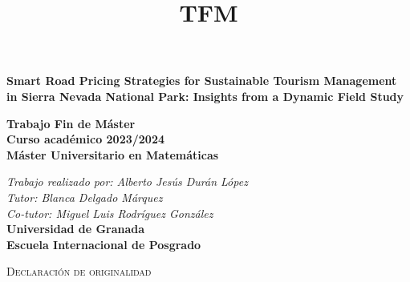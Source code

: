 \documentclass[12pt]{book}
\title{TFM}
\begin{document}
\usetikzlibrary{arrows}

\begin{titlepage}
      \begin{center}
      \end{center}
      \vspace{2cm}
   \begin{center}
      \huge\textbf{Smart Road Pricing Strategies for Sustainable Tourism Management in Sierra Nevada National Park: Insights from a Dynamic Field Study}\\
      \end{center}
       \vspace{1 cm}
      
         \begin{center}
      \large\textbf{Trabajo Fin de Máster}\\
      \large\textbf{Curso académico 2023/2024}\\
      \large\textbf{Máster Universitario en Matemáticas}\\
      \end{center}
      \vspace{2 cm}
      \begin{center}
\large\textit{Trabajo realizado por: Alberto Jesús Durán López}\\
 \large\textit{Tutor: Blanca Delgado Márquez}\\
\large\textit{Co-tutor: Miguel Luis Rodríguez González}\\

\vspace{3.5 cm}
\large \textbf{Universidad de Granada} \\
\large \textbf{Escuela Internacional de Posgrado} \\
\end{center}
\end{titlepage}



\newpage
\thispagestyle{empty}
\mbox{}
\newpage

\thispagestyle{empty}

\vfill

\begin{center}
    \textsc{\huge Declaración de originalidad}\\[1cm]
\end{center}
\end{document}
